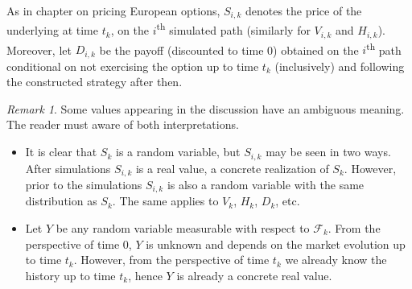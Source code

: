 \documentclass[a4paper,11pt, twoside]{book}
\theoremstyle{definition}
\theoremstyle{remark}
\newtheorem{remark}{Remark}[chapter]
\begin{document}
As in chapter on pricing European options, $S_{i,k}$ denotes the price of the underlying at time $t_k$, on the $i$\textsuperscript{th} simulated path (similarly for $V_{i,k}$ and $H_{i,k}$). Moreover, let $D_{i,k}$ be the payoff (discounted to time 0) obtained on the $i$\textsuperscript{th} path conditional on not exercising the option up to time $t_k$ (inclusively) and following the constructed strategy after then.

\begin{remark}
  Some values appearing in the discussion have an ambiguous meaning. The reader must aware of both interpretations.
 \begin{itemize}
  \item It is clear that $S_{k}$ is a random variable, but $S_{i,k}$ may be seen in two ways. After simulations $S_{i,k}$ is a real value, a concrete realization of $S_{k}$. However, prior to the simulations $S_{i,k}$ is also a random variable with the same distribution as $S_k$. The same applies to  $V_k$, $H_k$, $D_k$, etc.
  \item Let $Y$ be any random variable measurable with respect to $\mathcal{F}_k$. From the perspective of time 0, $Y$ is unknown and depends on the market evolution up to time $t_k$. However, from the perspective of time $t_k$ we already know the history up to time $t_k$, hence $Y$ is already a concrete real value.
 \end{itemize}
\end{remark}
\end{document}
